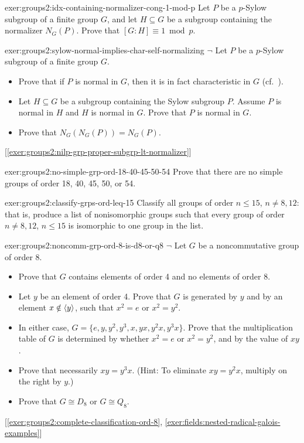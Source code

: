 \begin{exer}{}{exer:groups2:idx-containing-normalizer-cong-1-mod-p}
  Let $P$ be a $p$-Sylow subgroup of a finite group $G$, and let
  $H \subseteq G$ be a subgroup containing the normalizer
  $N_G(P)$. Prove that $[G : H] \equiv 1 \bmod p$.
\end{exer}
\begin{exer}{}{exer:groups2:sylow-normal-implies-char-self-normalizing}
  $\lnot$ Let $P$ be a $p$-Sylow subgroup of a finite group $G$.
  \begin{itemize}
  \item Prove that if $P$ is normal in $G$, then it is in fact
    characteristic in $G$ (cf.\
    ).
  \item Let $H \subseteq G$ be a subgroup containing the Sylow
    subgroup $P$.  Assume $P$ is normal in $H$ and $H$ is normal in
    $G$. Prove that $P$ is normal in $G$.
  \item Prove that $N_G(N_G(P)) = N_G(P)$.
  \end{itemize}
  [\ref{exer:groups2:nilp-grp-proper-subgrp-lt-normalizer}]
\end{exer}
\begin{exer}{}{exer:groups2:no-simple-grp-ord-18-40-45-50-54}
  Prove that there are no simple groups of order 18, 40, 45, 50, or
  54.
\end{exer}
\begin{exer}{}{exer:groups2:classify-grps-ord-leq-15}
  Classify all groups of order $n \leq 15$, $n \neq 8, 12$: that is,
  produce a list of nonisomorphic groups such that every group of
  order $n \neq 8, 12$, $n \leq 15$ is isomorphic to one group in the
  list.
\end{exer}
\begin{exer}{}{exer:groups2:noncomm-grp-ord-8-is-d8-or-q8}
  $\lnot$ Let $G$ be a noncommutative group of order 8.
  \begin{itemize}
  \item Prove that $G$ contains elements of order 4 and no elements of
    order 8.
  \item Let $y$ be an element of order 4. Prove that $G$ is generated
    by $y$ and by an element $x \notin \langle y\rangle$, such that
    $x^2 = e$ or $x^2 = y^2$.
  \item In either case, $G = \{e, y, y^2, y^3, x, yx, y^2x,
    y^3x\}$. Prove that the multiplication table of $G$ is determined
    by whether $x^2 = e$ or $x^2 = y^2$, and by the value of $xy$.
  \item Prove that necessarily $xy = y^3 x$. (Hint: To eliminate
    $xy = y^2 x$, multiply on the right by $y$.)
  \item Prove that $G \cong D_8$ or $G \cong Q_8$.
  \end{itemize} [\ref{exer:groups2:complete-classification-ord-8},
  \ref{exer:fields:nested-radical-galois-examples}]
\end{exer}
